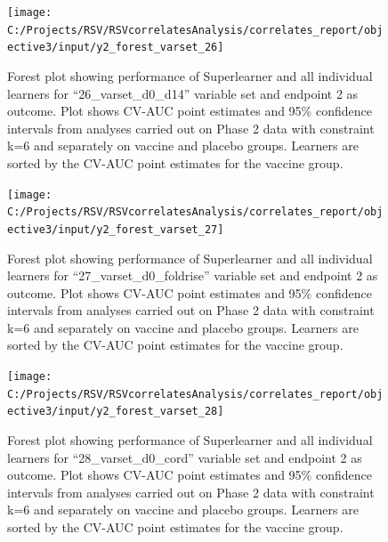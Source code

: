\documentclass[11pt]{article}
\begin{document}
\begin{figure}[H]

{\centering \texttt{[image: C:/Projects/RSV/RSVcorrelatesAnalysis/correlates\_report/objective3/input/y2\_forest\_varset\_26]} 

}

\caption[Forest plot for ``26\_varset\_d0\_d14'' variable set, endpoint 2.]{Forest plot showing performance of Superlearner and all individual learners for ``26\_varset\_d0\_d14'' variable set and endpoint 2 as outcome. Plot shows CV-AUC point estimates and 95\% confidence intervals from analyses carried out on Phase 2 data with constraint k=6 and separately on vaccine and placebo groups. Learners are sorted by the CV-AUC point estimates for the vaccine group.}\label{fig:y2-forest-varset-26}
\end{figure}

\begin{figure}[H]

{\centering \texttt{[image: C:/Projects/RSV/RSVcorrelatesAnalysis/correlates\_report/objective3/input/y2\_forest\_varset\_27]} 

}

\caption[Forest plot for ``27\_varset\_d0\_foldrise'' variable set, endpoint 2.]{Forest plot showing performance of Superlearner and all individual learners for ``27\_varset\_d0\_foldrise'' variable set and endpoint 2 as outcome. Plot shows CV-AUC point estimates and 95\% confidence intervals from analyses carried out on Phase 2 data with constraint k=6 and separately on vaccine and placebo groups. Learners are sorted by the CV-AUC point estimates for the vaccine group.}\label{fig:y2-forest-varset-27}
\end{figure}

\begin{figure}[H]

{\centering \texttt{[image: C:/Projects/RSV/RSVcorrelatesAnalysis/correlates\_report/objective3/input/y2\_forest\_varset\_28]} 

}

\caption[Forest plot for ``28\_varset\_d0\_cord'' variable set, endpoint 2.]{Forest plot showing performance of Superlearner and all individual learners for ``28\_varset\_d0\_cord'' variable set and endpoint 2 as outcome. Plot shows CV-AUC point estimates and 95\% confidence intervals from analyses carried out on Phase 2 data with constraint k=6 and separately on vaccine and placebo groups. Learners are sorted by the CV-AUC point estimates for the vaccine group.}\label{fig:y2-forest-varset-28}
\end{figure}
\end{document}
